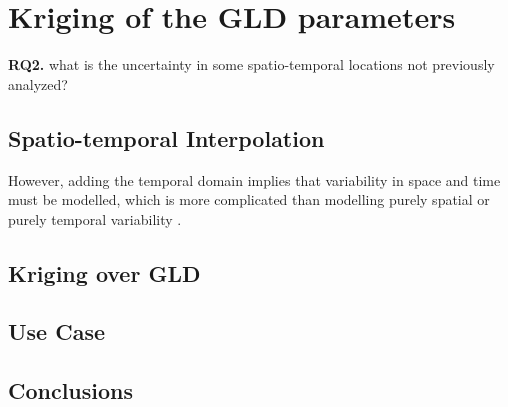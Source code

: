 \chapter{Kriging of the GLD parameters}\label{cap:kriging}

\begin{tcolorbox}
\textbf{RQ2.} what is the uncertainty in some spatio-temporal locations not previously analyzed?
\end{tcolorbox}


\section{Spatio-temporal Interpolation}
However, adding the temporal domain implies that variability in space and time must be modelled, which is more complicated than modelling purely spatial or purely temporal variability \cite{Graler2016}.

\section{Kriging over GLD}

\section{Use Case}

\section{Conclusions}
